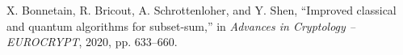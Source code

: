 
X. Bonnetain, R. Bricout, A. Schrottenloher, and Y. Shen, ``Improved classical
and quantum algorithms for subset-sum,'' in \textit{Advances in Cryptology --
EUROCRYPT}, 2020, pp. 633--660.





%
%
